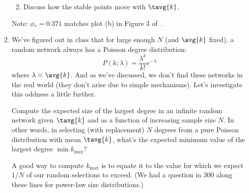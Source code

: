 \begin{enumerate}
\begin{enumerate}

   \solutionend

  \item  
    Discuss how the stable points move with $\tavg{k}$.

    
   \solutionstart


   \solutionend

  \end{enumerate}
  
  Note: $\phi_{\ast} = 0.371$ matches plot (b) in Figure 3 of~\cite{gleeson2007a}.

  
   \solutionstart


   \solutionend

  \item
  We've figured out in class that for large enough $N$ 
  (and $\avg{k}$ fixed),
  a random network always has a Poisson degree distribution:
  $$
  P(k;\lambda)
  =
  \frac{\lambda^{k}}
  {k!}
  e^{-\lambda}
  $$
  where $\lambda = \avg{k}$.
  And as we've discussed, we don't find these networks in the real world
  (they don't arise due to simple mechanisms).
  Let's investigate this oddness a little further.

  Compute the expected size of the largest degree 
  in an infinite random network given $\tavg{k}$ and as a function of 
  increasing sample size $N$.
  In other words, in selecting (with replacement) $N$ degrees from a
  pure Poisson distribution
  with mean $\tavg{k}$, what's the expected minimum value of the 
  largest degree $\min k_{\max}$?

  A good way to compute $k_{\max}$ is to equate
  it to the value for which we expect $1/N$ of our
  random selections to exceed.  (We had a question in 300
  along these lines for power-law size distributions.)


  
   \solutionstart


   \solutionend


   \solutionstart


\end{enumerate}
